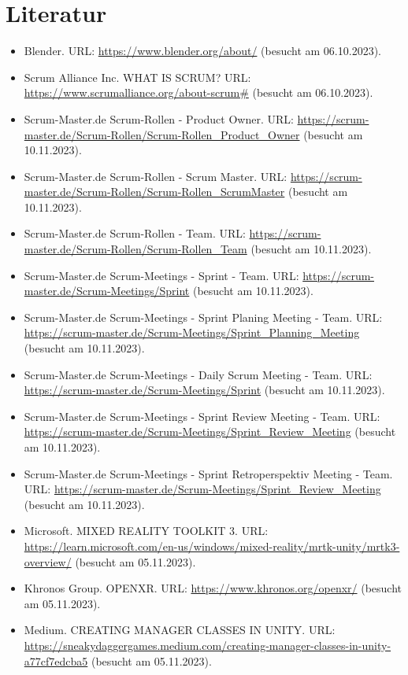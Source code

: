 \chapter{Literatur}

\begin{itemize}
    \item Blender. URL: \url{https://www.blender.org/about/} (besucht am 06.10.2023).
    \item Scrum Alliance Inc. WHAT IS SCRUM? URL: \url{https://www.scrumalliance.org/about-scrum#} (besucht am 06.10.2023).
    \item Scrum-Master.de Scrum-Rollen - Product Owner. URL: \url{https://scrum-master.de/Scrum-Rollen/Scrum-Rollen_Product_Owner} (besucht am 10.11.2023).
    \item Scrum-Master.de Scrum-Rollen - Scrum Master. URL: \url{https://scrum-master.de/Scrum-Rollen/Scrum-Rollen_ScrumMaster} (besucht am 10.11.2023).
    \item Scrum-Master.de Scrum-Rollen - Team. URL: \url{https://scrum-master.de/Scrum-Rollen/Scrum-Rollen_Team} (besucht am 10.11.2023).
    \item Scrum-Master.de Scrum-Meetings - Sprint - Team. URL: \url{https://scrum-master.de/Scrum-Meetings/Sprint} (besucht am 10.11.2023).
    \item Scrum-Master.de Scrum-Meetings - Sprint Planing Meeting - Team. URL: \url{https://scrum-master.de/Scrum-Meetings/Sprint_Planning_Meeting} (besucht am 10.11.2023).
    \item Scrum-Master.de Scrum-Meetings - Daily Scrum Meeting - Team. URL: \url{https://scrum-master.de/Scrum-Meetings/Sprint} (besucht am 10.11.2023).
    \item Scrum-Master.de Scrum-Meetings - Sprint Review Meeting - Team. URL: \url{https://scrum-master.de/Scrum-Meetings/Sprint_Review_Meeting} (besucht am 10.11.2023).
    \item Scrum-Master.de Scrum-Meetings - Sprint Retroperspektiv Meeting - Team. URL: \url{https://scrum-master.de/Scrum-Meetings/Sprint_Review_Meeting} (besucht am 10.11.2023).
    \item Microsoft. MIXED REALITY TOOLKIT 3. URL: \url{https://learn.microsoft.com/en-us/windows/mixed-reality/mrtk-unity/mrtk3-overview/} (besucht am 05.11.2023).
    \item Khronos Group. OPENXR. URL: \url{https://www.khronos.org/openxr/} (besucht am 05.11.2023).
    \item Medium. CREATING MANAGER CLASSES IN UNITY. URL: \url{https://sneakydaggergames.medium.com/creating-manager-classes-in-unity-a77cf7edcba5} (besucht am 05.11.2023).

\end{itemize}
